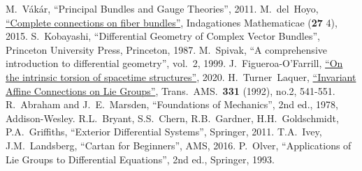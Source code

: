 \begin{thebibliography}{}
     M.~V\'ak\'ar, ``Principal Bundles and Gauge Theories'', 2011.
     M.~del~Hoyo, \href{https://arxiv.org/abs/1512.03847}{``Complete connections on fiber bundles''}, Indagationes Mathematicae (\textbf{27} 4), 2015.
     S.~Kobayashi, ``Differential Geometry of Complex Vector Bundles'', Princeton University Press, Princeton, 1987.
     M.~Spivak, ``A comprehensive introduction to differential geometry'', vol.~2, 1999.
     J.~Figueroa-O'Farrill, \href{https://arxiv.org/abs/2009.01948v1}{``On the intrinsic torsion of spacetime structures''}, 2020.
     H.~Turner~Laquer, \href{https://doi.org/10.2307/2154126}{``Invariant Affine Connections on Lie Groups''}, Trans.~AMS.~\textbf{331} (1992), no.2, 541-551.
     R.~Abraham and J.~E.~Marsden, ``Foundations of Mechanics'', 2nd ed., 1978, Addison-Wesley.
     R.L.~Bryant, S.S.~Chern, R.B.~Gardner, H.H.~Goldschmidt, P.A.~Griffiths, ``Exterior Differential Systems'', Springer, 2011.
     T.A.~Ivey, J.M.~Landsberg, ``Cartan for Beginners'', AMS, 2016.
     P.~Olver, ``Applications of Lie Groups to Differential Equations'', 2nd ed., Springer, 1993.

    
\end{thebibliography}